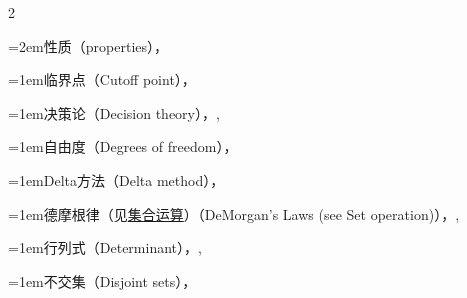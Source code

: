 \begin{multicols}{2}
\par\noindent\hangindent=2em\hspace*{1em}\label{idx:242}性质（properties），\hyperref[thm:1.5.3]{\pageref*{thm:1.5.3}}\par
\par\addvspace{2pt}
\par\noindent\hangindent=1em\hspace*{0em}\label{idx:243}临界点（Cutoff point），\hyperref[idxocc:243:344]{\pageref*{idxocc:243:344}}\par
\par\addvspace{2pt}
\par\noindent\hangindent=1em\hspace*{0em}\label{idx:244}决策论（Decision theory），\hyperref[sec:7.3.4]{\pageref*{sec:7.3.4}}, \hyperref[sec:8.3.5]{\pageref*{sec:8.3.5}}\par
\par\addvspace{2pt}
\par\noindent\hangindent=1em\hspace*{0em}\label{idx:245}自由度（Degrees of freedom），\hyperref[eq:3.3.10]{\pageref*{eq:3.3.10}}\par
\par\addvspace{2pt}
\par\noindent\hangindent=1em\hspace*{0em}\label{idx:246}Delta方法（Delta method），\hyperref[sec:5.5.4]{\pageref*{sec:5.5.4}}\par
\par\addvspace{2pt}
\par\noindent\hangindent=1em\hspace*{0em}\label{idx:247}德摩根律（见\hyperref[idx:959]{集合运算}）（DeMorgan’s Laws (see Set operation)），\hyperref[idxocc:247:36]{\pageref*{idxocc:247:36}}, \hyperref[exercise:1.9]{\pageref*{exercise:1.9}}\par
\par\addvspace{2pt}
\par\noindent\hangindent=1em\hspace*{0em}\label{idx:248}行列式（Determinant），\hyperref[idxocc:248:160]{\pageref*{idxocc:248:160}}, \hyperref[idxocc:248:182]{\pageref*{idxocc:248:182}}\par
\par\addvspace{2pt}
\par\noindent\hangindent=1em\hspace*{0em}\label{idx:249}不交集（Disjoint sets），\hyperref[def:1.1.5]{\pageref*{def:1.1.5}}\par

\end{multicols}
